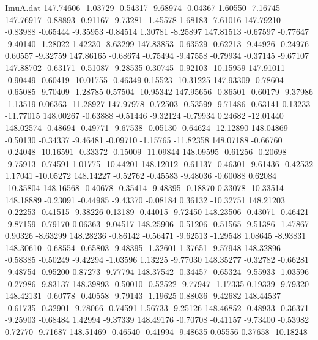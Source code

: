 \begin{filecontents}{ImuA.dat}
 147.74606   -1.03729   -0.54317   -9.68974   -0.04367    1.60550   -7.16745
 147.76917   -0.88893   -0.91167   -9.73281   -1.45578    1.68183   -7.61016
 147.79210   -0.83988   -0.65444   -9.35953   -0.84514    1.30781   -8.25897
 147.81513   -0.67597   -0.77647   -9.40140   -1.28022    1.42230   -8.63299
 147.83853   -0.63529   -0.62213   -9.44926   -0.24976    0.60557   -9.32759
 147.86165   -0.68674   -0.75494   -9.47558   -0.79934   -0.37145   -9.67107
 147.88702   -0.63171   -0.51087   -9.28535    0.30745   -0.92103  -10.15959
 147.91011   -0.90449   -0.60419  -10.01755   -0.46349    0.15523  -10.31225
 147.93309   -0.78604   -0.65085   -9.70409   -1.28785    0.57504  -10.95342
 147.95656   -0.86501   -0.60179   -9.37986   -1.13519    0.06363  -11.28927
 147.97978   -0.72503   -0.53599   -9.71486   -0.63141    0.13233  -11.77015
 148.00267   -0.63888   -0.51446   -9.32124   -0.79934    0.24682  -12.01440
 148.02574   -0.48694   -0.49771   -9.67538   -0.05130   -0.64624  -12.12890
 148.04869   -0.50130   -0.34337   -9.46481   -0.09710   -1.15765  -11.82358
 148.07188   -0.66760   -0.24048  -10.16591   -0.33372   -0.15009  -11.09844
 148.09595   -0.61256   -0.20698   -9.75913   -0.74591    1.01775  -10.44201
 148.12012   -0.61137   -0.46301   -9.61436   -0.42532    1.17041  -10.05272
 148.14227   -0.52762   -0.45583   -9.48036   -0.60088    0.62084  -10.35804
 148.16568   -0.40678   -0.35414   -9.48395   -0.18870    0.33078  -10.33514
 148.18889   -0.23091   -0.44985   -9.43370   -0.08184    0.36132  -10.32751
 148.21203   -0.22253   -0.41515   -9.38226    0.13189   -0.44015   -9.72450
 148.23506   -0.43071   -0.46421   -9.87159   -0.79170    0.06363   -9.04517
 148.25906   -0.51206   -0.51565   -9.51386   -1.47867    0.90326   -8.63299
 148.28236   -0.86142   -0.56471   -9.62513   -1.29548    1.08645   -8.93831
 148.30610   -0.68554   -0.65803   -9.48395   -1.32601    1.37651   -9.57948
 148.32896   -0.58385   -0.50249   -9.42294   -1.03596    1.13225   -9.77030
 148.35277   -0.32782   -0.66281   -9.48754   -0.95200    0.87273   -9.77794
 148.37542   -0.34457   -0.65324   -9.55933   -1.03596   -0.27986   -9.83137
 148.39893   -0.50010   -0.52522   -9.77947   -1.17335    0.19339   -9.79320
 148.42131   -0.60778   -0.40558   -9.79143   -1.19625    0.88036   -9.42682
 148.44537   -0.61735   -0.32901   -9.78066   -0.74591    1.56733   -9.25126
 148.46852   -0.48933   -0.36371   -9.25903   -0.68484    1.42994   -9.37339
 148.49176   -0.70708   -0.41157   -9.73400   -0.53982    0.72770   -9.71687
 148.51469   -0.46540   -0.41994   -9.48635    0.05556    0.37658  -10.18248

\end{filecontents}
